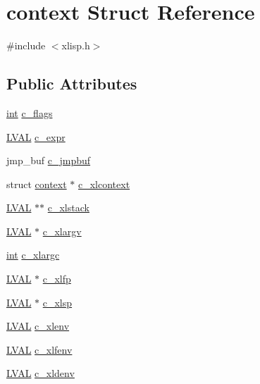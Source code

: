\hypertarget{structcontext}{}\section{context Struct Reference}
\label{structcontext}


{\ttfamily \#include $<$xlisp.\+h$>$}

\subsection*{Public Attributes}
\begin{DoxyCompactItemize}
\item 
\hyperlink{xmltok_8h_a5a0d4a5641ce434f1d23533f2b2e6653}{int} \hyperlink{structcontext_a7062c84d18a7cf165dabd8374ac5c34c}{c\+\_\+flags}
\item 
\hyperlink{xldmem_8h_a9a9ec6a5fbca2b40ed8d19faa799be8c}{L\+V\+AL} \hyperlink{structcontext_a230c537ba0567c96a7adb503ef3f60f6}{c\+\_\+expr}
\item 
jmp\+\_\+buf \hyperlink{structcontext_a927d089e4e08536e2ac562a8c0f1c482}{c\+\_\+jmpbuf}
\item 
struct \hyperlink{structcontext}{context} $\ast$ \hyperlink{structcontext_ab875672af9513f4f5a59613c352ab807}{c\+\_\+xlcontext}
\item 
\hyperlink{xldmem_8h_a9a9ec6a5fbca2b40ed8d19faa799be8c}{L\+V\+AL} $\ast$$\ast$ \hyperlink{structcontext_ab0cded4b5c36cd31ccc615bd3ef99b96}{c\+\_\+xlstack}
\item 
\hyperlink{xldmem_8h_a9a9ec6a5fbca2b40ed8d19faa799be8c}{L\+V\+AL} $\ast$ \hyperlink{structcontext_aaf337a658ba4dc5c21a1824c5e77ada4}{c\+\_\+xlargv}
\item 
\hyperlink{xmltok_8h_a5a0d4a5641ce434f1d23533f2b2e6653}{int} \hyperlink{structcontext_a0b1153f557a555aa960fdc31dcddb719}{c\+\_\+xlargc}
\item 
\hyperlink{xldmem_8h_a9a9ec6a5fbca2b40ed8d19faa799be8c}{L\+V\+AL} $\ast$ \hyperlink{structcontext_ac75e092bb4459afcf34642cf84bf6e85}{c\+\_\+xlfp}
\item 
\hyperlink{xldmem_8h_a9a9ec6a5fbca2b40ed8d19faa799be8c}{L\+V\+AL} $\ast$ \hyperlink{structcontext_acfd34b17e765579d2ea5be18ad44a982}{c\+\_\+xlsp}
\item 
\hyperlink{xldmem_8h_a9a9ec6a5fbca2b40ed8d19faa799be8c}{L\+V\+AL} \hyperlink{structcontext_a2e72d4b066ac227fbc5b58143d9263f4}{c\+\_\+xlenv}
\item 
\hyperlink{xldmem_8h_a9a9ec6a5fbca2b40ed8d19faa799be8c}{L\+V\+AL} \hyperlink{structcontext_afad0936bb5bd6e551a30f8c95ee86afb}{c\+\_\+xlfenv}
\item 
\hyperlink{xldmem_8h_a9a9ec6a5fbca2b40ed8d19faa799be8c}{L\+V\+AL} \hyperlink{structcontext_a118951781a108d36b70642d908f3e767}{c\+\_\+xldenv}
\end{DoxyCompactItemize}


